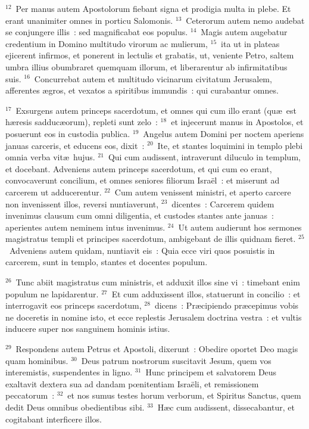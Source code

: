 ${}^{12}$~Per manus autem Apostolorum fiebant signa et prodigia multa in plebe. Et erant unanimiter omnes in porticu Salomonis.
${}^{13}$~Ceterorum autem nemo audebat se conjungere illis~: sed magnificabat eos populus.
${}^{14}$~Magis autem augebatur credentium in Domino multitudo virorum ac mulierum,
${}^{15}$~ita ut in plateas ejicerent infirmos, et ponerent in lectulis et grabatis, ut, veniente Petro, saltem umbra illius obumbraret quemquam illorum, et liberarentur ab infirmitatibus suis.
${}^{16}$~Concurrebat autem et multitudo vicinarum civitatum Jerusalem, afferentes \ae gros, et vexatos a spiritibus immundis~: qui curabantur omnes.


${}^{17}$~Exsurgens autem princeps sacerdotum, et omnes qui cum illo erant (qu\ae\ est h\ae resis sadduc\ae orum), repleti sunt zelo~:
${}^{18}$~et injecerunt manus in Apostolos, et posuerunt eos in custodia publica.
${}^{19}$~Angelus autem Domini per noctem aperiens januas carceris, et educens eos, dixit~:
${}^{20}$~Ite, et stantes loquimini in templo plebi omnia verba vit\ae\ hujus.
${}^{21}$~Qui cum audissent, intraverunt diluculo in templum, et docebant. Adveniens autem princeps sacerdotum, et qui cum eo erant, convocaverunt concilium, et omnes seniores filiorum Isra\"el~: et miserunt ad carcerem ut adducerentur.
${}^{22}$~Cum autem venissent ministri, et aperto carcere non invenissent illos, reversi nuntiaverunt,
${}^{23}$~dicentes~: Carcerem quidem invenimus clausum cum omni diligentia, et custodes stantes ante januas~: aperientes autem neminem intus invenimus.
${}^{24}$~Ut autem audierunt hos sermones magistratus templi et principes sacerdotum, ambigebant de illis quidnam fieret.
${}^{25}$~Adveniens autem quidam, nuntiavit eis~: Quia ecce viri quos posuistis in carcerem, sunt in templo, stantes et docentes populum.


${}^{26}$~Tunc abiit magistratus cum ministris, et adduxit illos sine vi~: timebant enim populum ne lapidarentur.
${}^{27}$~Et cum adduxissent illos, statuerunt in concilio~: et interrogavit eos princeps sacerdotum,
${}^{28}$~dicens~: Pr\ae cipiendo pr\ae cepimus vobis ne doceretis in nomine isto, et ecce replestis Jerusalem doctrina vestra~: et vultis inducere super nos sanguinem hominis istius.


${}^{29}$~Respondens autem Petrus et Apostoli, dixerunt~: Obedire oportet Deo magis quam hominibus.
${}^{30}$~Deus patrum nostrorum suscitavit Jesum, quem vos interemistis, suspendentes in ligno.
${}^{31}$~Hunc principem et salvatorem Deus exaltavit dextera sua ad dandam pœnitentiam Isra\"eli, et remissionem peccatorum~:
${}^{32}$~et nos sumus testes horum verborum, et Spiritus Sanctus, quem dedit Deus omnibus obedientibus sibi.
${}^{33}$~H\ae c cum audissent, dissecabantur, et cogitabant interficere illos.


